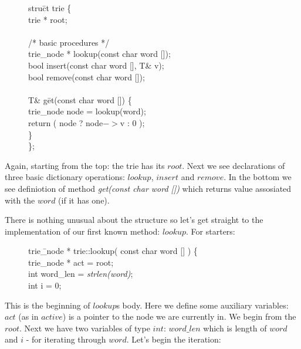 \documentclass[a4paper,12pt]{article}
\begin{document}
\begin{figure}[!h]
\begin{tabbing}
stru\=ct trie \{ \\
\>    trie * root; \\
\>	\\
\>		/* basic procedures */ \\
\>		trie\_node * lookup(const char word []); \\
\>		bool insert(const char word [], T\& v); \\
\>		bool remove(const char word []); \\
\>	\\	
\>		T\& g\=et(const char word []) \{ \\
\> \>				trie\_node node = lookup(word); \\
\> \>				return ( node ? node$->$v : 0 ); \\
\>		\} \\
\};
\end{tabbing}
\end{figure}

Again, starting from the top: the trie has its $root$. Next we see declarations of three basic dictionary operations: $lookup$, $insert$ and $remove$. In the bottom we see definiotion of method \emph{get(const char word [])} which returns value assosiated with the $word$ (if it has one).

There is nothing unusual about the structure so let's get straight to the implementation of our first known method: $lookup$. For starters:

\begin{figure}[!h]
\begin{tabbing}
trie\=\_node * trie::lookup( const char word [] ) \{ \\
\>  trie\_node * act = root; \\
\>  int word\_len = \emph{strlen(word)}; \\
\>  int i = 0; \\
\end{tabbing}
\end{figure}

\noindent This is the beginning of $lookup$s body. Here we define some auxiliary variables: $act$ (as in $active$) is a pointer to the node we are currently in. We begin from the $root$. Next we have two variables of type $int$: $word\_len$ which is length of $word$ and $i$ - for iterating through $word$. Let's begin the iteration: 

\newpage
\end{document}
